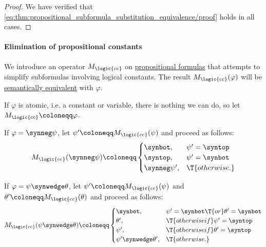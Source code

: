 \begin{proof}
  We have verified that \eqref{eq:thm:propositional_subformula_substitution_equivalence/proof} holds in all cases.
\end{proof}

\paragraph{Elimination of propositional constants}

\begin{algorithm}\label{alg:propositional_constant_collapse}
  We introduce an operator \( M_{\logic{cc}} \) on \hyperref[def:propositional_formula]{propositional formulas} that attempts to simplify subformulas involving logical constants. The result \( M_{\logic{cc}}(\varphi) \) will be \hyperref[def:propositional_semantics/equivalence]{semantically equivalent} with \( \varphi \).

  \begin{thmenum}
     If \( \varphi \) is atomic, i.e. a constant or variable, there is nothing we can do, so let \( M_{\logic{cc}} \coloneqq \varphi \).

     If \( \varphi = \synneg \psi \), let \( \psi' \coloneqq M_{\logic{cc}}(\psi) \) and proceed as follows:
    \begin{equation*}
      M_{\logic{cc}}(\synneg \psi) \coloneqq \begin{cases}
        \synbot,       &\psi' = \syntop \\
        \syntop,       &\psi' = \synbot \\
        \synneg \psi', &\T{otherwise.}
      \end{cases}
    \end{equation*}

     If \( \varphi = \psi \synwedge \theta \), let \( \psi' \coloneqq M_{\logic{cc}}(\psi) \) and \( \theta' \coloneqq M_{\logic{cc}}(\theta) \) and proceed as follows:
    \begin{equation*}
      M_{\logic{cc}}(\psi \synwedge \theta) \coloneqq \begin{cases}
        \synbot,                   &\psi' = \synbot \T{or} \theta' = \synbot \\
        \theta',                   &\T{otherwise if} \psi' = \syntop \\
        \psi',                     &\T{otherwise if} \theta' = \syntop \\
        \psi' \synwedge \theta',   &\T{otherwise.}
      \end{cases}
    \end{equation*}


\end{thmenum}
\end{algorithm}
